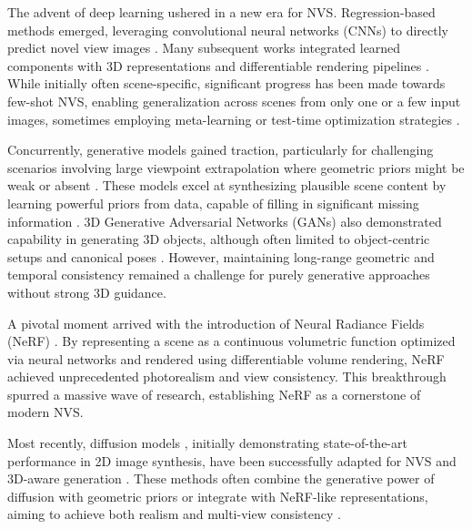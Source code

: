 The advent of deep learning ushered in a new era for NVS. Regression-based methods emerged, leveraging convolutional neural networks (CNNs) to directly predict novel view images \cite{flynn2016deepstereo}. Many subsequent works integrated learned components with 3D representations and differentiable rendering pipelines \cite{kato2018neural}. While initially often scene-specific, significant progress has been made towards few-shot NVS, enabling generalization across scenes from only one or a few input images, sometimes employing meta-learning or test-time optimization strategies \cite{yu2021pixelnerf}. %

Concurrently, generative models gained traction, particularly for challenging scenarios involving large viewpoint extrapolation where geometric priors might be weak or absent \cite{wiles2020pixelsynth, rombach2021geometry}. These models excel at synthesizing plausible scene content by learning powerful priors from data, capable of filling in significant missing information \cite{niemeyer2021giraffe, ren2022look}. 3D Generative Adversarial Networks (GANs) also demonstrated capability in generating 3D objects, although often limited to object-centric setups and canonical poses \cite{wu2016learning}. However, maintaining long-range geometric and temporal consistency remained a challenge for purely generative approaches without strong 3D guidance.

A pivotal moment arrived with the introduction of Neural Radiance Fields (NeRF) \cite{mildenhall2020nerf}. By representing a scene as a continuous volumetric function optimized via neural networks and rendered using differentiable volume rendering, NeRF achieved unprecedented photorealism and view consistency. This breakthrough spurred a massive wave of research, establishing NeRF as a cornerstone of modern NVS.

Most recently, diffusion models \cite{dhariwal2021diffusion}, initially demonstrating state-of-the-art performance in 2D image synthesis, have been successfully adapted for NVS and 3D-aware generation \cite{poole2022dreamfusion, watson2022novel}. These methods often combine the generative power of diffusion with geometric priors or integrate with NeRF-like representations, aiming to achieve both realism and multi-view consistency \cite{kulhanek2023consistent}. %

